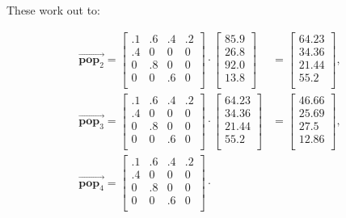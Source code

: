 \begin{alttitles}
\smallskip
These work out to:

\vspace{-.15in}
\begin{align*}
\overrightarrow{\textbf{pop}_2} =
\begin{bmatrix}
.1 & .6 & .4 & .2 \\
.4 & 0 & 0 & 0 \\
0 & .8 & 0 & 0 \\
0 & 0 & .6 & 0 \\
\end{bmatrix} \cdot
\begin{bmatrix}
85.9 \\ 26.8 \\ 92.0 \\ 13.8 \\
\end{bmatrix} &=
\begin{bmatrix}
64.23 \\ 34.36 \\ 21.44 \\ 55.2 \\
\end{bmatrix}, \\
\overrightarrow{\textbf{pop}_3} =
\begin{bmatrix}
.1 & .6 & .4 & .2 \\
.4 & 0 & 0 & 0 \\
0 & .8 & 0 & 0 \\
0 & 0 & .6 & 0 \\
\end{bmatrix} \cdot
\begin{bmatrix}
64.23 \\ 34.36 \\ 21.44 \\ 55.2 \\
\end{bmatrix} &=
\begin{bmatrix}
46.66 \\ 25.69 \\ 27.5 \\ 12.86 \\
\end{bmatrix}, \\
\overrightarrow{\textbf{pop}_4} =
\begin{bmatrix}
.1 & .6 & .4 & .2 \\
.4 & 0 & 0 & 0 \\
0 & .8 & 0 & 0 \\
0 & 0 & .6 & 0 \\
\end{bmatrix} \cdot

\end{align*}
\end{alttitles}

